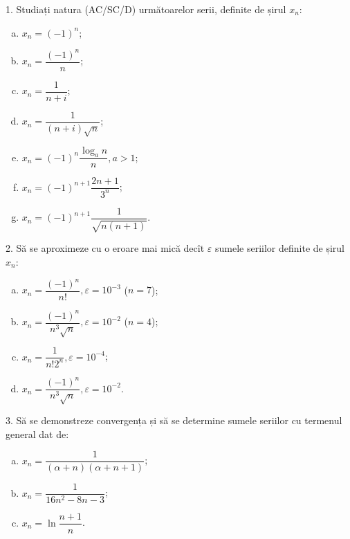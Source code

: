 1. Studiați natura (AC/SC/D) următoarelor serii, definite de șirul $ x_n $:
\begin{enumerate}[(a)]
\item $ x_n = (-1)^n $;
\item $ x_n = \dfrac{(-1)^n}{n} $;
\item $ x_n = \dfrac{1}{n + i} $;
\item $ x_n = \dfrac{1}{(n + i)\sqrt{n}} $;
\item $ x_n = (-1)^n \dfrac{\log_a n}{n}, a > 1 $;
\item $ x_n = (-1)^{n+1} \dfrac{2n + 1}{3^n} $;
\item $ x_n = (-1)^{n+1} \dfrac{1}{\sqrt{n(n+1)}} $.
\end{enumerate}

\vspace{1cm}

2. Să se aproximeze cu o eroare mai mică decît $ \varepsilon $ sumele seriilor
definite de șirul $ x_n $:
\begin{enumerate}[(a)]
\item $ x_n = \dfrac{(-1)^n}{n!}, \varepsilon = 10^{-3} $ ($ n = 7 $);
\item $ x_n = \dfrac{(-1)^n}{n^3 \sqrt{n}}, \varepsilon  = 10^{-2} $ ($ n = 4 $);
\item $ x_n = \dfrac{1}{n! 2^n}, \varepsilon = 10^{-4} $;
\item $ x_n = \dfrac{(-1)^n}{n^3 \sqrt{n}}, \varepsilon = 10^{-2} $.
\end{enumerate}

\vspace{1cm}

3. Să se demonstreze convergența și să se determine sumele seriilor cu
termenul general dat de:
\begin{enumerate}[(a)]
\item $ x_n = \dfrac{1}{(\alpha + n)(\alpha + n + 1)} $;
\item $ x_n = \dfrac{1}{16n^2 - 8n - 3} $;
\item $ x_n = \ln \dfrac{n+1}{n} $.
\end{enumerate}


